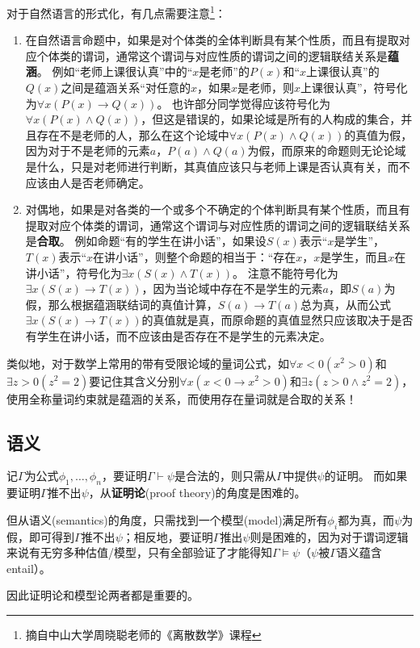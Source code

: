 对于自然语言的形式化，有几点需要注意\footnote{摘自中山大学周晓聪老师的《离散数学》课程}：
\begin{enumerate}
	\item 在自然语言命题中，如果是对个体类的全体判断具有某个性质，而且有提取对应个体类的谓词，通常这个谓词与对应性质的谓词之间的逻辑联结关系是\textbf{蕴涵}。
	例如“老师上课很认真”中的“$x$是老师”的$P(x)$和“$x$上课很认真”的$Q(x)$之间是蕴涵关系“对任意的$x$，如果$x$是老师，则$x$上课很认真”，符号化为$\forall x(P(x)\to Q(x))$。
	也许部分同学觉得应该符号化为$\forall x(P(x)\land Q(x))$，但这是错误的，如果论域是所有的人构成的集合，并且存在不是老师的人，那么在这个论域中$\forall x(P(x)\land Q(x))$的真值为假，因为对于不是老师的元素$a$，$P(a)\land Q(a)$为假，而原来的命题则无论论域是什么，只是对老师进行判断，其真值应该只与老师上课是否认真有关，而不应该由人是否老师确定。
	\item 对偶地，如果是对各类的一个或多个不确定的个体判断具有某个性质，而且有提取对应个体类的谓词，通常这个谓词与对应性质的谓词之间的逻辑联结关系是\textbf{合取}。
	例如命题“有的学生在讲小话”，如果设$S(x)$表示“$x$是学生”，$T(x)$表示“$x$在讲小话”，则整个命题的相当于：“存在$x$，$x$是学生，而且$x$在讲小话”，符号化为$\exists x(S(x)\land T(x))$。
	注意不能符号化为$\exists x(S(x) \to T(x))$，因为当论域中存在不是学生的元素$a$，即$S(a)$为假，那么根据蕴涵联结词的真值计算，$S(a) \to T(a)$总为真，从而公式$\exists x(S(x) \to T(x))$的真值就是真，而原命题的真值显然只应该取决于是否有学生在讲小话，而不应该由是否存在不是学生的元素决定。
\end{enumerate}
类似地，对于数学上常用的带有受限论域的量词公式，如$\forall x < 0(x^2 > 0)$和$\exists z > 0(z^2 = 2)$要记住其含义分别$\forall x(x < 0 \to x^2 > 0)$和$\exists z(z > 0 \land z^2 = 2)$，使用全称量词约束就是蕴涵的关系，而使用存在量词就是合取的关系！

\subsection{语义}
记$\Gamma$为公式$\phi_1,\ldots,\phi_n$，要证明$\Gamma\vdash\psi$是合法的，则只需从$\Gamma$中提供$\psi$的证明。
而如果要证明$\Gamma$推不出$\psi$，从\textbf{证明论}(proof theory)的角度是困难的。

但从语义(semantics)的角度，只需找到一个模型(model)满足所有$\phi_i$都为真，而$\psi$为假，即可得到$\Gamma$推不出$\psi$；相反地，要证明$\Gamma$推出$\psi$则是困难的，因为对于谓词逻辑来说有无穷多种估值/模型，只有全部验证了才能得知$\Gamma\models\psi$（$\psi$被$\Gamma$语义蕴含entail）。

因此证明论和模型论两者都是重要的。

